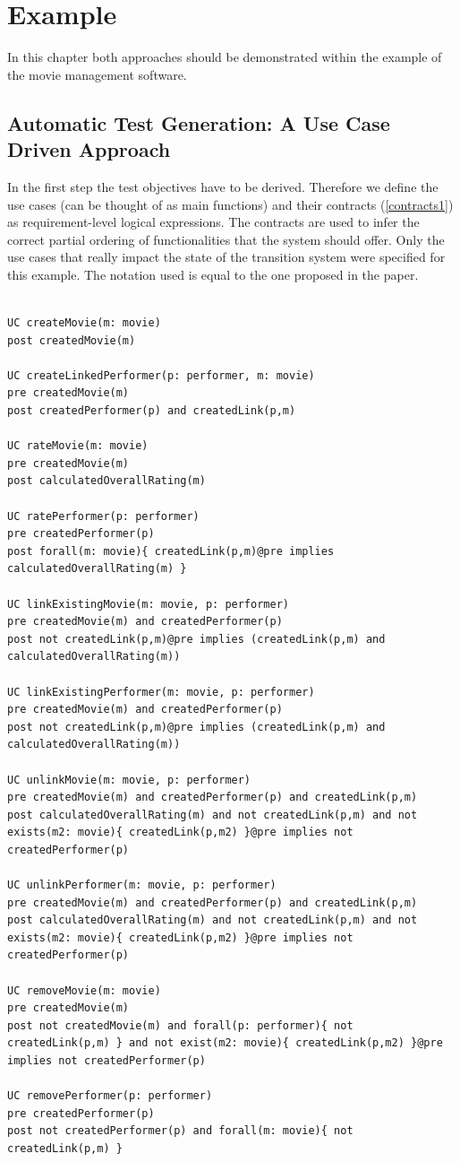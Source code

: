 \section{Example}

In this chapter both approaches should be demonstrated within the example of the movie management software.  

\subsection{Automatic Test Generation: A Use Case Driven Approach}

In the first step the test objectives have to be derived. Therefore we define the use cases (can be thought of as main functions) and their contracts (\autoref{contracts1}) as requirement-level logical expressions. The contracts are used to infer the correct partial ordering of functionalities that the system should offer. Only the use cases that really impact the state of the transition system were specified for this example. The notation used is equal to the one proposed in the paper. 

\begin{lstlisting}[caption={Contracts attached to use cases},label={contracts1}]

UC createMovie(m: movie)
post createdMovie(m)

UC createLinkedPerformer(p: performer, m: movie)
pre createdMovie(m)
post createdPerformer(p) and createdLink(p,m)

UC rateMovie(m: movie)
pre createdMovie(m)
post calculatedOverallRating(m)

UC ratePerformer(p: performer)
pre createdPerformer(p)
post forall(m: movie){ createdLink(p,m)@pre implies calculatedOverallRating(m) }

UC linkExistingMovie(m: movie, p: performer)
pre createdMovie(m) and createdPerformer(p)
post not createdLink(p,m)@pre implies (createdLink(p,m) and calculatedOverallRating(m))

UC linkExistingPerformer(m: movie, p: performer)
pre createdMovie(m) and createdPerformer(p)
post not createdLink(p,m)@pre implies (createdLink(p,m) and calculatedOverallRating(m))

UC unlinkMovie(m: movie, p: performer)
pre createdMovie(m) and createdPerformer(p) and createdLink(p,m)
post calculatedOverallRating(m) and not createdLink(p,m) and not exists(m2: movie){ createdLink(p,m2) }@pre implies not createdPerformer(p)

UC unlinkPerformer(m: movie, p: performer)
pre createdMovie(m) and createdPerformer(p) and createdLink(p,m)
post calculatedOverallRating(m) and not createdLink(p,m) and not exists(m2: movie){ createdLink(p,m2) }@pre implies not createdPerformer(p)

UC removeMovie(m: movie)
pre createdMovie(m)
post not createdMovie(m) and forall(p: performer){ not createdLink(p,m) } and not exist(m2: movie){ createdLink(p,m2) }@pre implies not createdPerformer(p)

UC removePerformer(p: performer)
pre createdPerformer(p)
post not createdPerformer(p) and forall(m: movie){ not createdLink(p,m) }
\end{lstlisting}

